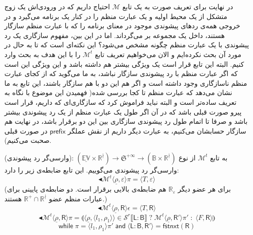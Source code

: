 در نهایت برای تعریف صورت به یک تابع $\mathcal{M}$ احتیاج داریم که در ورودی‌اش یک زوج متشکل از یک محیط اولیه و یک عبارت منظم را در کنار یک برنامه می‌گیرد و در خروجی همه‌ی ردهای پیشوندی موجود در معنای برنامه را که با عبارت منظم سازگار هستند، داخل یک مجموعه بر می‌گرداند.
اما در این بین، مفهوم سازگاری یک رد پیشوندی با یک عبارت منظم چگونه مشخص می‌شود؟ این نکته‌ای است که تا به حال در مورد آن بحث نکرده‌ایم و الان می‌خواهیم تعریف تابع $\mathcal{M}^t$ را با این هدف به بحث وارد کنیم. البته این تابع قرار است یک ویژگی بیشتر هم داشته باشد و این ویژگی این است که اگر عبارت منظم با رد پیشوندی سازگار نباشد، به ما می‌گوید که از کجای عبارت منظم ناسازگاری وجود داشته  است و اگر هم این دو با هم سازگار باشند، این تابع به ما نشان می‌دهد که عبارت منظم تا کجا بررسی شده( فهمیدن این موضوع با نگاه به تعریف ساده‌تر است و البته نباید فراموش کرد که سازگاری‌ای که داریم، قرار است پیرو صورت قبلی باشد که در آن اگر طول یک عبارت منظم از یک رد پیشوندی بیشتر باشد و صرفا تا اتمام طول رد پیشوندی سازگاری بین این دو برقرار باشد، در نهایت هم سازگار حسابشان می‌کنیم، به عبارت دیگر داریم از نقش عملگر $\mathsf{prefix}$ در صورت قبلی صحبت می‌کنیم).
\begin{defn}
	(وارسی‌گر رد پیشوندی): به تابع $\mathcal{M}^t$ از نوع 
	$\mathbb{(\underline{EV} \times R^\nmid) \rightarrow  \mathfrak{S}^{+\infty}}
	\rightarrow (\mathbb{B \times R^\nmid} ) $
	وارسی‌گر رد پیشوندی می‌گوییم. این تابع ضابطه‌ی زیر را دارد:
	$$\blacktriangleleft\mathcal{M}^t \langle \underline{\rho} , \varepsilon \rangle \pi = 
	\langle \mathit{T} , \varepsilon \rangle$$
	(برای هر عضو دیگر $\mathbb{R_\varepsilon}$ هم ضابطه‌ی بالایی برقرار است. دو ضابطه‌ی پایینی برای عبارات منظم عضو $\mathbb{R^+ \cap R^\nmid}$ هستند.)
	$$\blacktriangleleft\mathcal{M}^t \langle \underline{\rho} , \mathsf{R} \rangle \epsilon = 
	\langle \mathit{T} , \mathsf{R} \rangle$$
	$$\blacktriangleleft\mathcal{M}^t \langle \underline{\rho} , \mathsf{R} \rangle \pi = 
	\llparenthesis \langle \underline{\rho}, \langle l_1, \rho_1 \rangle \rangle \in
	\mathcal{S}^r \llbracket \mathsf{L:B} \rrbracket \; ? \; 
	\mathcal{M}^t \langle \underline{\rho}, \mathsf{R'} \rangle \pi' \; : \; 
	\langle \mathit{F}, \mathsf{R} \rangle \rrparenthesis$$
	$$\mathsf{while}\; \pi=\langle l_1,\rho_1\rangle \pi' \;\mathsf{and}\; 
	\langle \mathsf{L:B,R'}\rangle = \mathsf{fstnxt(R)}$$
	
\end{defn}

